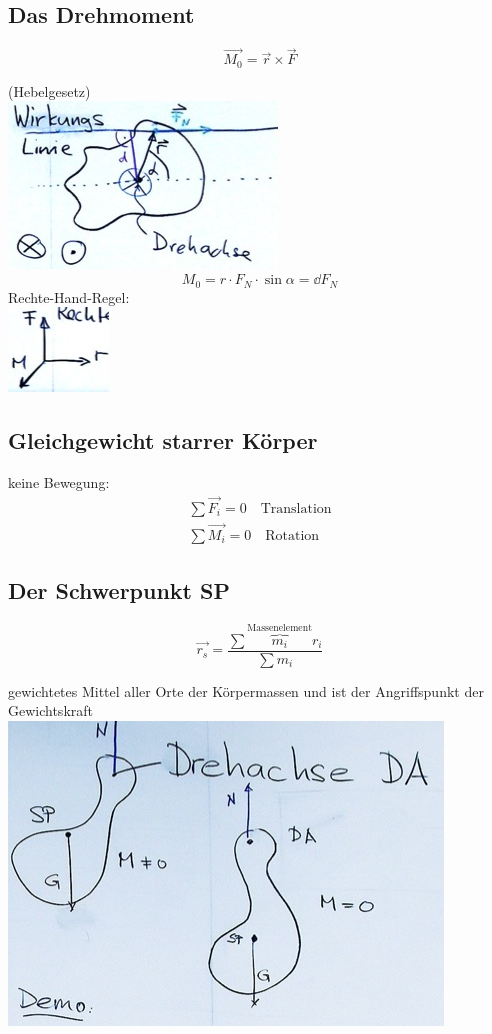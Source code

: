 \subsection{Das Drehmoment}
\begin{def*}[ note = Drehmoment , index = Drehmoment ]
	\[ \vec{M_0} = \vec{r} \times \vec{F} \]
\end{def*}
(Hebelgesetz) \\
\includegraphics{Bild36}
\[ M_0 = r \cdot F_N \cdot \sin \alpha = \dd F_N \]
Rechte-Hand-Regel: \\
\includegraphics{Bild37}

\subsection{Gleichgewicht starrer Körper}
keine Bewegung:
\begin{gather*}
	\sum \vec{F_i} = 0 \quad \text{Translation} \\
	\sum \vec{M_i} = 0 \quad \text{Rotation}
\end{gather*}

\subsection{Der Schwerpunkt SP}
\begin{def*}[ note = Schwerpunkt , index = Schwerpunkt ]
	\[ \vec{r_s} = \frac{\sum \overbrace{m_i}^{\text{Massenelement}} r_i}{\sum m_i} \]
\end{def*}
gewichtetes  Mittel aller Orte der Körpermassen und ist der Angriffspunkt der Gewichtskraft \\
\includegraphics{Bild38}

